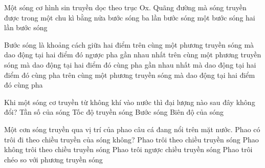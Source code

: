 \begin{ex}%
Một sóng cơ hình sin truyền dọc theo trục Ox. Quãng đường mà sóng truyền được trong một chu kì bằng
\choice
{nửa bước sóng}
{ba lần bước sóng}
{\True một bước sóng}
{hai lần bước sóng}
\end{ex} 
\begin{ex}%
Bước sóng là khoảng cách giữa hai điểm
\choice
{trên cùng một phương truyền sóng mà dao động tại hai điểm đó ngược pha}
{\True gần nhau nhất trên cùng một phương truyền sóng mà dao động tại hai điểm đó cùng pha}
{gần nhau nhất mà dao động tại hai điểm đó cùng pha}
{trên cùng một phương truyền sóng mà dao động tại hai điểm đó cùng pha}
\end{ex} 


\begin{ex}%
 Khi một sóng cơ truyền từ không khí vào nước thì đại lượng nào sau đây không đổi?
\choice
{\True Tần số của sóng}
{Tốc độ truyền sóng}
{Bước sóng}
{Biên độ của sóng}
\end{ex} 




\begin{ex}%
Một cơn sóng truyền qua vị trí của phao câu cá đang nổi trên mặt nước. Phao có trôi đi theo chiều truyền của sóng không?
\choice
{Phao trôi theo chiều truyền sóng}
{\True Phao không trôi theo chiều truyền sóng}
{Phao trôi ngược chiều truyền sóng}
{Phao trôi chéo so với phương truyền sóng}
\end{ex} 
























